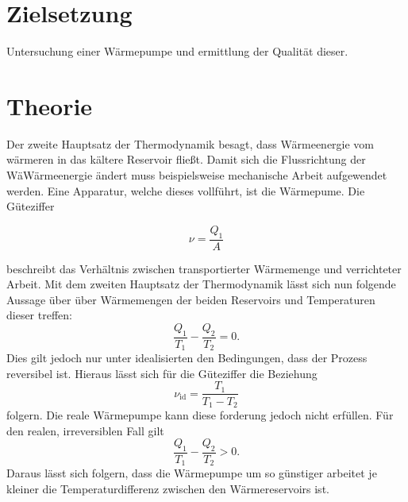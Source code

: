 \section{Zielsetzung}
Untersuchung einer Wärmepumpe und ermittlung der Qualität dieser.
\section{Theorie}
\label{sec:Theorie}

Der zweite Hauptsatz der Thermodynamik besagt, dass Wärmeenergie vom wärmeren in das kältere Reservoir fließt.
Damit sich die Flussrichtung der WäWärmeenergie ändert muss beispielsweise mechanische Arbeit aufgewendet werden.
Eine Apparatur, welche dieses vollführt, ist die Wärmepume.
Die Güteziffer

\begin{equation*}
	\nu=\frac{Q_1}{A}
\end{equation*}

beschreibt das Verhältnis zwischen transportierter Wärmemenge und verrichteter Arbeit.
Mit dem zweiten Hauptsatz der Thermodynamik lässt sich nun folgende Aussage über über Wärmemengen der beiden Reservoirs und Temperaturen dieser treffen:
\begin{equation*}
	\frac{Q_1}{T_1}-\frac{Q_2}{T_2}=0.
\end{equation*}
Dies gilt jedoch nur unter idealisierten den Bedingungen, dass der Prozess reversibel ist.
Hieraus lässt sich für die Güteziffer die Beziehung
\begin{equation}
	\nu_{\text{id}}=\frac{T_1}{T_1-T_2}
	\label{eq:guetezifferideal}
\end{equation}
folgern.
Die reale Wärmepumpe kann diese forderung jedoch nicht erfüllen.
Für den realen, irreversiblen Fall gilt
\begin{equation*}
	\frac{Q_1}{T_1}-\frac{Q_2}{T_2}>0 .
\end{equation*}
Daraus lässt sich folgern, dass die Wärmepumpe um so günstiger arbeitet je kleiner die Temperaturdifferenz zwischen den Wärmereservoirs ist.
